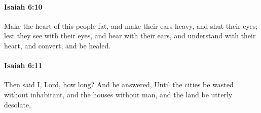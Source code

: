 		\paragraph{Isaiah 6:10} %
			\label{ISAIAH-6-10}

			Make the heart of this people fat, and make their ears heavy, and shut their eyes; lest they see with their eyes, and hear with their ears, and understand with their heart, and convert, and be healed.


		\paragraph{Isaiah 6:11} %
			\label{ISAIAH-6-11}

			Then said I, Lord, how long? And he answered, Until the cities be wasted without inhabitant, and the houses without man, and the land be utterly desolate,


